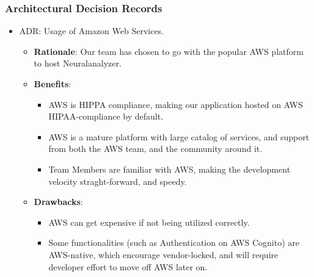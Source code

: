 \documentclass[12pt]{article}
\newcounter{adrnum} %
\begin{document}
\subsubsection{Architectural Decision Records}
\begin{itemize}
\item ADR\theadrnum \label{ADR_AWS_for_prod}: Usage of Amazon Web Services.
    \begin{itemize}
        \item \textbf{Rationale}: Our team has chosen to go with the popular AWS platform to host Neuralanalyzer.
        \item \textbf{Benefits}:
        \begin{itemize}
            \item AWS is HIPPA compliance, making our application hosted on AWS HIPAA-compliance by default.
            \item AWS is a mature platform with large catalog of services, and support from both the AWS team, and the community around it.
            \item Team Members are familiar with AWS, making the development velocity straght-forward, and speedy.
        \end{itemize}
        \item \textbf{Drawbacks}:
        \begin{itemize}
            \item AWS can get expensive if not being utilized correctly.
            \item Some functionalities (such as Authentication on AWS Cognito) are AWS-native, which encourage vendor-locked, and will require developer effort to move off AWS later on. 
        \end{itemize}
    \end{itemize}
    

\end{itemize}
\end{document}
